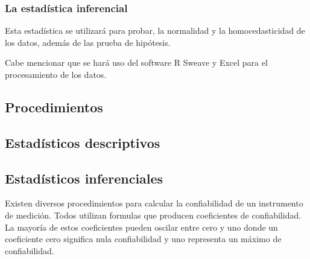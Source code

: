 \documentclass[12pt,a4paper]{article}
\begin{document}
\subsubsection{La estadística inferencial} Esta estadística se utilizará para probar, la normalidad y la homocedasticidad  de los datos, además de las prueba de hipótesis.

Cabe mencionar que se hará uso del software R Sweave y Excel para el procesamiento de los datos.

%
%
%
%
%
%

\subsection{Procedimientos}
\subsection{Estadísticos descriptivos}
\subsection{Estadísticos inferenciales}

Existen  diversos procedimientos para calcular la confiabilidad de un instrumento de medición. Todos utilizan formulas que producen coeficientes de confiabilidad. La mayoría de estos coeficientes pueden oscilar entre cero y uno donde un coeficiente cero significa nula confiabilidad y uno representa  un máximo de confiabilidad.
\end{document}
